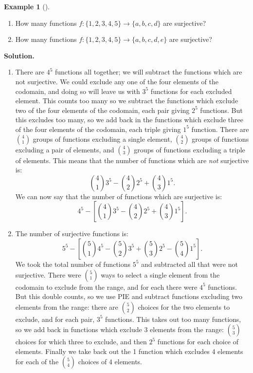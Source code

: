 \documentclass[10pt,]{book}
\theoremstyle{plain}
\theoremstyle{definition}
\newtheorem{example}[theorem]{Example}
\theoremstyle{definition}
\theoremstyle{definition}
\numberwithin{equation}{chapter}
\begin{document}
\begin{example}[]\label{example-54}
\leavevmode%
\begin{enumerate}
\item\hypertarget{li-635}{}
    How many functions \(f: \{1,2,3,4,5\} \to \{a,b,c,d\}\) are surjective?
\item\hypertarget{li-636}{}
    How many functions \(f: \{1,2,3,4,5\} \to \{a,b,c,d,e\}\) are surjective?
\end{enumerate}
\par\medskip\noindent%
\textbf{Solution.}\quad \leavevmode%
\begin{enumerate}
\item\hypertarget{li-637}{}
    There are \(4^5\) functions all together; we will subtract the functions which are not surjective.  We could exclude any one of the four elements of the codomain, and doing so will leave us with \(3^5\) functions for each excluded element.  This counts too many so we subtract the functions which exclude two of the four elements of the codomain, each pair giving \(2^5\) functions.  But this excludes too many, so we add back in the functions which exclude three of the four elements of the codomain, each triple giving \(1^5\) function.  There are \({4 \choose 1}\) groups of functions excluding a single element, \({4 \choose 2}\) groups of functions excluding a pair of elements, and \({4 \choose 3}\) groups of functions excluding a triple of elements.  This means that the number of functions which are \emph{not} surjective is:
    \begin{equation*}
      {4 \choose 1}3^5 - {4 \choose 2}2^5 + {4 \choose 3}1^5.
    \end{equation*}
    We can now say that the number of functions which are surjective is:
    \begin{equation*}
      4^5 - \left[{4 \choose 1}3^5 - {4 \choose 2}2^5 + {4 \choose 3}1^5\right].
    \end{equation*}
\item\hypertarget{li-638}{}
    The number of surjective functions is:
    \begin{equation*}
      5^5 - \left[{5 \choose 1}4^5 - {5 \choose 2}3^5 + {5 \choose 3}2^5 - {5 \choose 4}1^5\right].
    \end{equation*}
    We took the total number of functions \(5^5\) and subtracted all that were not surjective.  There were \({5 \choose 1}\) ways to select a single element from the codomain to exclude from the range, and for each there were \(4^5\) functions.  But this double counts, so we use PIE and subtract functions excluding two elements from the range: there are \({5 \choose 2}\) choices for the two elements to exclude, and for each pair, \(3^5\) functions.  This takes out too many functions, so we add back in functions which exclude 3 elements from the range: \({5 \choose 3}\) choices for which three to exclude, and then \(2^5\) functions for each choice of elements.  Finally we take back out the 1 function which excludes 4 elements for each of the \({5 \choose 4}\) choices of 4 elements.
\par


\end{enumerate}
\end{example}
\end{document}
